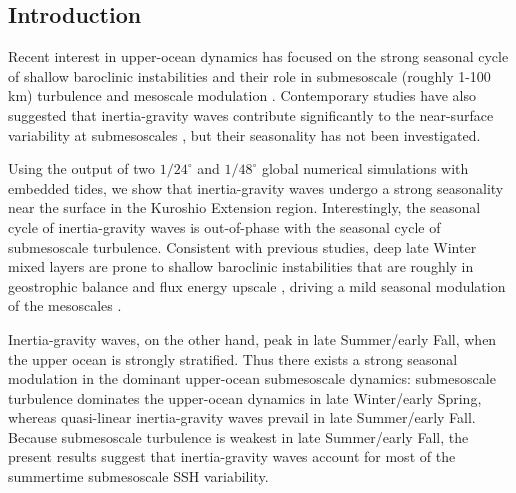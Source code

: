 \documentclass[grl]{agutex2015}
\begin{document}
\begin{article}

%
%

\section{Introduction}

Recent interest in upper-ocean dynamics has focused on the strong seasonal
cycle of shallow baroclinic instabilities and their role in submesoscale (roughly 1-100 km)
turbulence and mesoscale modulation \citep{sasaki_etal2014,qiu_etal2014,
callies_etal2015, thompson_etal2016,buckingham_etal2016}. Contemporary studies
have also suggested that inertia-gravity waves contribute significantly
to the near-surface variability at submesoscales \citep{richman_etal2012,
buhler_etal2014,rocha_etal2016}, but their seasonality has not been investigated.

Using the output of two $1/24^\circ$ and $1/48^\circ$ global
numerical simulations with embedded tides, we show that inertia-gravity waves undergo
a strong seasonality near the surface in the Kuroshio Extension region.
Interestingly, the seasonal cycle of inertia-gravity waves is out-of-phase
with the seasonal cycle of submesoscale turbulence. Consistent with previous studies,
deep late Winter mixed layers are prone to
shallow baroclinic instabilities that are roughly in geostrophic balance
and flux energy upscale \citep{sasaki_etal2014,callies_etal2016},
driving a mild seasonal modulation of the mesoscales \citep{sasaki_etal2014,qiu_etal2014}.

Inertia-gravity waves, on the other hand, peak in late Summer/early Fall,
when the upper ocean is strongly stratified. Thus there exists a
strong seasonal modulation in the dominant upper-ocean submesoscale dynamics:
submesoscale turbulence dominates the upper-ocean dynamics in late Winter/early Spring,
whereas quasi-linear inertia-gravity waves prevail in late Summer/early Fall.
Because submesoscale turbulence is weakest in late Summer/early Fall,
the present results suggest that inertia-gravity waves account for most of the
summertime submesoscale SSH variability.


\end{article}
\end{document}
